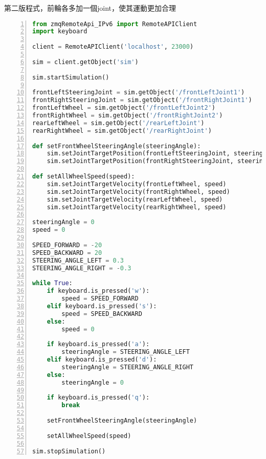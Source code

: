 第二版程式，前輪各多加一個joint，使其運動更加合理\\
\begin{lstlisting}[language=Python, frame=single, numbers=left, captionpos=b, basicstyle=\ttfamily\small, showstringspaces=false, breaklines=true, tabsize=4, xleftmargin=15pt]
from zmqRemoteApi_IPv6 import RemoteAPIClient
import keyboard
 
client = RemoteAPIClient('localhost', 23000)
 
sim = client.getObject('sim')
 
sim.startSimulation()
 
frontLeftSteeringJoint = sim.getObject('/frontLeftJoint1')
frontRightSteeringJoint = sim.getObject('/frontRightJoint1')
frontLeftWheel = sim.getObject('/frontLeftJoint2')
frontRightWheel = sim.getObject('/frontRightJoint2')
rearLeftWheel = sim.getObject('/rearLeftJoint')
rearRightWheel = sim.getObject('/rearRightJoint')
 
def setFrontWheelSteeringAngle(steeringAngle):
    sim.setJointTargetPosition(frontLeftSteeringJoint, steeringAngle)
    sim.setJointTargetPosition(frontRightSteeringJoint, steeringAngle)
 
def setAllWheelSpeed(speed):
    sim.setJointTargetVelocity(frontLeftWheel, speed)
    sim.setJointTargetVelocity(frontRightWheel, speed)
    sim.setJointTargetVelocity(rearLeftWheel, speed)
    sim.setJointTargetVelocity(rearRightWheel, speed)
 
steeringAngle = 0
speed = 0
 
SPEED_FORWARD = -20
SPEED_BACKWARD = 20
STEERING_ANGLE_LEFT = 0.3
STEERING_ANGLE_RIGHT = -0.3
 
while True:
    if keyboard.is_pressed('w'):
        speed = SPEED_FORWARD
    elif keyboard.is_pressed('s'):
        speed = SPEED_BACKWARD
    else:
        speed = 0
 
    if keyboard.is_pressed('a'):
        steeringAngle = STEERING_ANGLE_LEFT
    elif keyboard.is_pressed('d'):
        steeringAngle = STEERING_ANGLE_RIGHT
    else:
        steeringAngle = 0
 
    if keyboard.is_pressed('q'):
        break 
 
    setFrontWheelSteeringAngle(steeringAngle)
     
    setAllWheelSpeed(speed)
 
sim.stopSimulation()
\end{lstlisting}
